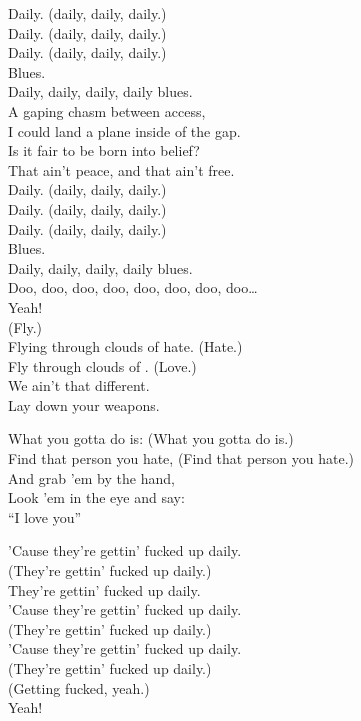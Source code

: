 Daily. (daily, daily, daily.) \\
Daily. (daily, daily, daily.) \\
Daily. (daily, daily, daily.) \\
Blues. \\
Daily, daily, daily, daily blues. \\

A gaping chasm between access, \\
I could land a plane inside of the gap. \\
Is it fair to be born into belief? \\
That ain't peace, and that ain't free. \\

Daily. (daily, daily, daily.) \\
Daily. (daily, daily, daily.) \\
Daily. (daily, daily, daily.) \\
Blues. \\
Daily, daily, daily, daily blues. \\

Doo, doo, doo, doo, doo, doo, doo, doo… \\
Yeah! \\

(Fly.) \\
Flying through clouds of hate. (Hate.) \\
Fly through clouds of . (Love.) \\
We ain't that different. \\
Lay down your weapons. \\


What you gotta do is: (What you gotta do is.) \\
Find that person you hate, (Find that person you hate.) \\
And grab 'em by the hand, \\
Look 'em in the eye and say: \\
``I love you'' \\


'Cause they're gettin' fucked up daily. \\
(They're gettin' fucked up daily.) \\
They're gettin' fucked up daily. \\
'Cause they're gettin' fucked up daily. \\
(They're gettin' fucked up daily.) \\
'Cause they're gettin' fucked up daily. \\
(They're gettin' fucked up daily.) \\
(Getting fucked, yeah.) \\
Yeah!

